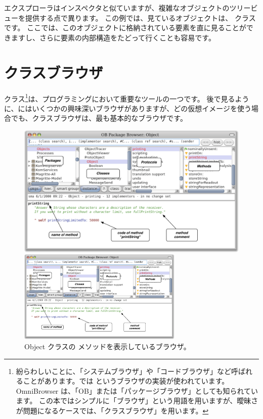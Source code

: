 \documentclass[a4paper,10pt,twoside]{book}
\begin{document}
エクスプローラはインスペクタと似ていますが、複雑なオブジェクトのツリービューを提供する点で異ります。
この例では、見ているオブジェクトは、 クラスです。
ここでは、このオブジェクトに格納されている要素を直に見ることができますし、さらに要素の内部構造をたどって行くことも容易です。

\section{クラスブラウザ}

クラス\footnote{紛らわしいことに、「システムブラウザ」や「コードブラウザ」など呼ばれることがあります。\pharo では  というブラウザの実装が使われています。OmniBrowser は、「OB」または「パッケージブラウザ」としても知られています。
この本ではシンプルに「ブラウザ」という用語を用いますが、曖昧さが問題になるケースでは、「クラスブラウザ」を用います。}は、プログラミングにおいて重要なツールの一つです。
後で見るように、\pharo にはいくつかの興味深いブラウザがありますが、どの仮想イメージを使う場合でも、クラスブラウザは、最も基本的なブラウザです。


\begin{figure}[htb]
\ifluluelse
	{\centerline {\includegraphics[width=\textwidth]{ClassBrowser1}}}
	{\centerline {\includegraphics[width=0.7\textwidth]{ClassBrowser1}}}
\caption{Object クラスの  メソッドを表示しているブラウザ。
}
\end{figure}
\end{document}
